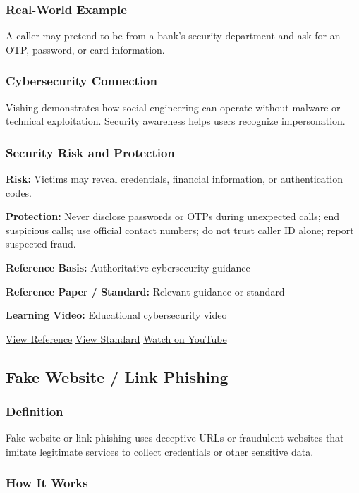 \documentclass[12pt,a4paper]{article}
\newcommand{\refs}[3]{%
    \textbf{Reference Basis:} Authoritative cybersecurity guidance\par
    \textbf{Reference Paper / Standard:} Relevant guidance or standard\par
    \textbf{Learning Video:} Educational cybersecurity video\par
    \href{#1}{\textcolor{linkblue}{View Reference}}
    \quad
    \href{#2}{\textcolor{linkblue}{View Standard}}
    \quad
    \href{#3}{\textcolor{linkblue}{Watch on YouTube}}
}
\begin{document}
\subsubsection{Real-World Example}

A caller may pretend to be from a bank's security department and ask for an OTP, password, or card information.

\subsubsection{Cybersecurity Connection}

Vishing demonstrates how social engineering can operate without malware or technical exploitation. Security awareness helps users recognize impersonation.

\subsubsection{Security Risk and Protection}

\textbf{Risk:} Victims may reveal credentials, financial information, or authentication codes.

\textbf{Protection:} Never disclose passwords or OTPs during unexpected calls; end suspicious calls; use official contact numbers; do not trust caller ID alone; report suspected fraud.

\refs
{https://consumer.ftc.gov/all-scams/phishing-scams}
{https://www.nist.gov/itl/smallbusinesscyber/guidance-topic/phishing}
{https://www.youtube.com/results?search_query=Professor+Messer+social+engineering}


\subsection{Fake Website / Link Phishing}

\subsubsection{Definition}

Fake website or link phishing uses deceptive URLs or fraudulent websites that imitate legitimate services to collect credentials or other sensitive data.

\subsubsection{How It Works}
\end{document}
